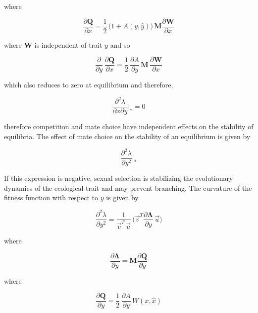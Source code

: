 where 

\begin{equation}
    \frac{\partial \pmb Q}{\partial x} = \frac{1}{2}\,\big(1+A(y,\hat y)\big)\,\pmb M \frac{\partial \pmb W}{\partial x}
\end{equation}

where $\pmb W$ is independent of trait $y$ and so

\begin{equation}
    \frac{\partial}{\partial y}\,\frac{\partial \pmb Q}{\partial x} = \frac{1}{2}\,\frac{\partial A}{\partial y}\,\pmb M\,\frac{\partial \pmb W}{\partial x}
\end{equation}

which also reduces to zero at equilibrium and therefore, 

\begin{equation}
    \frac{\partial^2 \lambda}{\partial x \partial y}\bigg|_* = 0
\end{equation}

therefore competition and mate choice  have independent effects on the stability of equilibria. The effect of mate choice on the stability of an equilibrium is given by

\begin{equation}
    \frac{\partial^2 \lambda}{\partial y^2}\bigg|_*
\end{equation}

If this expression is negative, sexual selection is stabilizing the evolutionary dynamics of the ecological trait and may prevent branching. The curvature of the fitness function with respect to $y$ is given by

\begin{equation}
    \frac{\partial^2 \lambda}{\partial y^2} = \frac{1}{\overrightarrow{v}^T\,\overrightarrow{u}}\,\bigg(\overrightarrow{v}^T\frac{\partial \pmb \Lambda}{\partial y}\,\overrightarrow{u}\bigg)
\end{equation}

where 

\begin{equation}
    \frac{\partial \pmb \Lambda}{\partial y} = \pmb M \frac{\partial \pmb Q}{\partial y}
\end{equation}

where

\begin{equation}
    \frac{\partial \pmb Q}{\partial y} = \frac{1}{2}\,\frac{\partial A}{\partial y}\,W(x,\hat x)
\end{equation}

